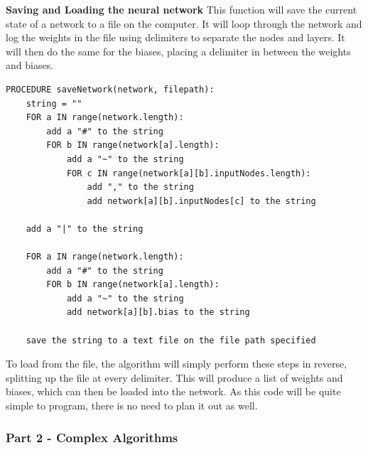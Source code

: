 \documentclass{report}
\begin{document}
\newpage
\noindent \textbf{Saving and Loading the neural network}
\newline
This function will save the current state of a network to a file on the computer. It will loop through the network and log the weights in the file using delimiters to separate the nodes and layers. It will then do the same for the biases, placing a delimiter in between the weights and biases.
\begin{verbatim}
PROCEDURE saveNetwork(network, filepath):
    string = ""
    FOR a IN range(network.length):
        add a "#" to the string
        FOR b IN range(network[a].length):
            add a "~" to the string
            FOR c IN range(network[a][b].inputNodes.length):
                add "," to the string
                add network[a][b].inputNodes[c] to the string
                
    add a "|" to the string
    
    FOR a IN range(network.length):
        add a "#" to the string
        FOR b IN range(network[a].length):
            add a "~" to the string
            add network[a][b].bias to the string
            
    save the string to a text file on the file path specified
\end{verbatim}
To load from the file, the algorithm will simply perform these steps in reverse, splitting up the file at every delimiter. This will produce a list of weights and biases, which can then be loaded into the network. As this code will be quite simple to program, there is no need to plan it out as well.

\newpage

\subsubsection{Part 2 - Complex Algorithms}
\end{document}
